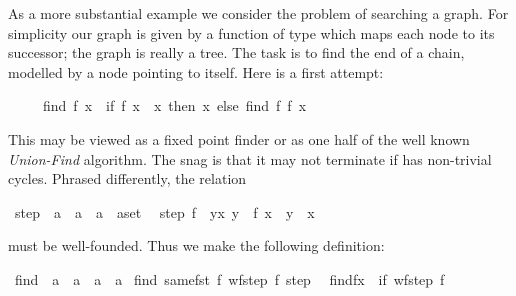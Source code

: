 \begin{isabellebody}
\begin{isamarkuptext}
As a more substantial example we consider the problem of searching a graph.
For simplicity our graph is given by a function  of
type  which
maps each node to its successor; the graph is really a tree.
The task is to find the end of a chain, modelled by a node pointing to
itself. Here is a first attempt:
\begin{isabelle}%
\ \ \ \ \ find\ {\isacharparenleft}f{\isacharcomma}\ x{\isacharparenright}\ {\isacharequal}\ {\isacharparenleft}if\ f\ x\ {\isacharequal}\ x\ then\ x\ else\ find\ {\isacharparenleft}f{\isacharcomma}\ f\ x{\isacharparenright}{\isacharparenright}%
\end{isabelle}
This may be viewed as a fixed point finder or as one half of the well known
\emph{Union-Find} algorithm.
The snag is that it may not terminate if  has non-trivial cycles.
Phrased differently, the relation%
\end{isamarkuptext}%
\isamarkuptrue%
\ step{}\ {\isacharcolon}{\isacharcolon}\ {\isachardoublequote}{\isacharparenleft}{\isacharprime}a\ {\isasymRightarrow}\ {\isacharprime}a{\isacharparenright}\ {\isasymRightarrow}\ {\isacharparenleft}{\isacharprime}a\ {\isasymtimes}\ {\isacharprime}a{\isacharparenright}set{\isachardoublequote}\isanewline
\ \ {\isachardoublequote}step{}\ f\ {\isasymequiv}\ {\isacharbraceleft}{\isacharparenleft}y{\isacharcomma}x{\isacharparenright}{\isachardot}\ y\ {\isacharequal}\ f\ x\ {\isasymand}\ y\ {\isasymnoteq}\ x{\isacharbraceright}{\isachardoublequote}\isamarkupfalse%
%
\begin{isamarkuptext}%
\noindent
must be well-founded. Thus we make the following definition:%
\end{isamarkuptext}%
\isamarkuptrue%
\ find\ {\isacharcolon}{\isacharcolon}\ {\isachardoublequote}{\isacharparenleft}{\isacharprime}a\ {\isasymRightarrow}\ {\isacharprime}a{\isacharparenright}\ {\isasymtimes}\ {\isacharprime}a\ {\isasymRightarrow}\ {\isacharprime}a{\isachardoublequote}\isanewline
\isamarkupfalse%
\ find\ {\isachardoublequote}same{\isacharunderscore}fst\ {\isacharparenleft}{\isasymlambda}f{\isachardot}\ wf{\isacharparenleft}step{}\ f{\isacharparenright}{\isacharparenright}\ step{}{\isachardoublequote}\isanewline
\ \ {\isachardoublequote}find{\isacharparenleft}f{\isacharcomma}x{\isacharparenright}\ {\isacharequal}\ {\isacharparenleft}if\ wf{\isacharparenleft}step{}\ f{\isacharparenright}\isanewline

\end{isabellebody}
